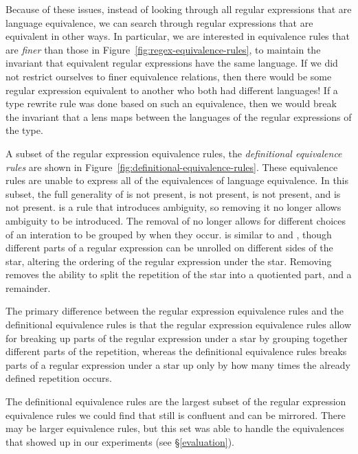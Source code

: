 \documentclass[numbers,10pt,preprint\ifanon ,nocopyrightspace\fi]{sigplanconf}
\begin{document}
Because of these issues, instead of looking through all regular expressions
that are
language equivalence, we can search through regular expressions that are
equivalent in other ways.  In particular,
we are interested in equivalence rules that are \emph{finer} than those in
Figure~\ref{fig:regex-equivalence-rules}, to maintain the invariant that
equivalent regular expressions have the same language.  If we did not restrict
ourselves to finer equivalence relations, then there would be some regular
expression equivalent to another who both had different languages!  If a type
rewrite rule was done based on such an equivalence, then we would break the
invariant that a lens maps between the languages of the regular expressions of
the type.

A subset of
the regular expression equivalence rules, the \textit{definitional equivalence
  rules} are shown in
Figure~\ref{fig:definitional-equivalence-rules}.  These equivalence rules are
unable to express all of the equivalences of language equivalence.  In this
subset, the full generality of \ProductstarRule{} is not present,
\DicyclicityRule{} is not present, \StarstarRule{} is not present,
and \SumstarRule{} is not present.  \StarstarRule{} is a rule that introduces
ambiguity, so removing it no longer allows ambiguity to be introduced.
The removal of \SumstarRule{} no longer allows for different choices of an
interation to be grouped by when they occur.  \ProductstarRule{} is similar to
\UnrollstarLeftRule{} and \UnrollstarRightRule, though different parts of a
regular expression can be unrolled
on different sides of the star, altering the ordering of the regular expression
under the star.
Removing \DicyclicityRule{} removes the ability to split the repetition of the
star into a quotiented part, and a remainder.

The primary difference between the regular expression equivalence rules and the
definitional equivalence rules is that the regular expression equivalence
rules allow for breaking up parts of the regular expression under a star by
grouping together different parts of the repetition, whereas the definitional
equivalence rules breaks parts of a regular expression under a star up only by
how many times the already defined repetition occurs.

The definitional equivalence rules are the largest subset of the regular
expression equivalence rules we could
find that still is confluent and can be mirrored.  There may be larger equivalence rules,
but this set was able to handle the equivalences that showed up in  our
experiments (see \S\ref{evaluation}).
\end{document}
